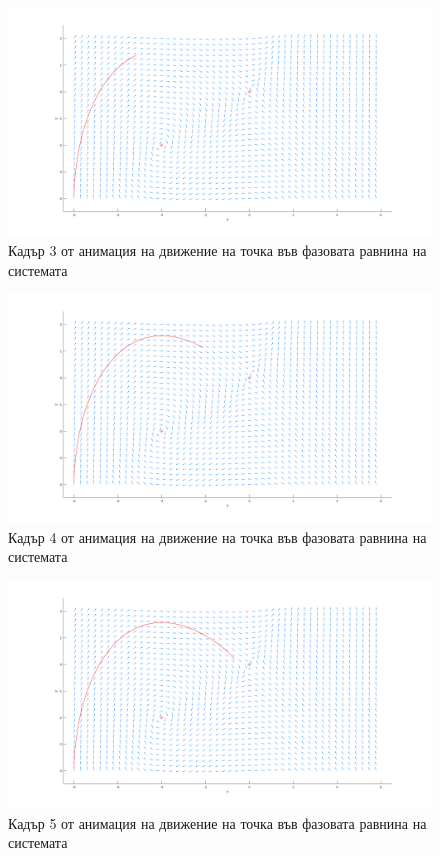 \documentclass[a4paper, 12pt]{article}
\begin{document}
\begin{figure}[ht]
    \centering
    \includegraphics[width=\textwidth]{move3.png}
    \caption{Кадър 3 от анимация на движение на точка във фазовата равнина на системата}
\end{figure}

\begin{figure}[ht]
    \centering
    \includegraphics[width=\textwidth]{move4.png}
    \caption{Кадър 4 от анимация на движение на точка във фазовата равнина на системата}
\end{figure}

\begin{figure}[ht]
    \centering
    \includegraphics[width=\textwidth]{move5.png}
    \caption{Кадър 5 от анимация на движение на точка във фазовата равнина на системата}
\end{figure}
\end{document}
